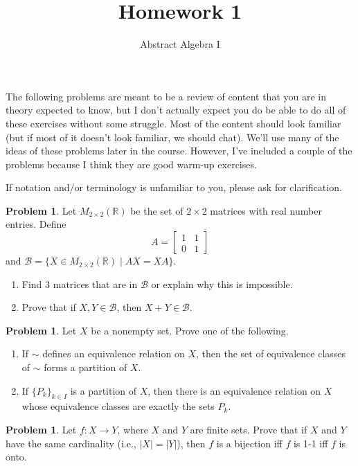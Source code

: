 \documentclass[11pt]{scrartcl}
\theoremstyle{definition}
\newtheorem{problem}[theorem]{Problem}
\begin{document}
\title{Homework 1}
\subtitle{Abstract Algebra I}
\date{}

\maketitle
\thispagestyle{fancy}

The following problems are meant to be a review of content that you are in theory expected to know, but I don't actually expect you do be able to do all of these exercises without some struggle.  Most of the content should look familiar (but if most of it doesn't look familiar, we should chat).  We'll use many of the ideas of these problems later in the course.  However, I've included a couple of the problems because I think they are good warm-up exercises.

If notation and/or terminology is unfamiliar to you, please ask for clarification.

\begin{problem}
Let $M_{2\times 2}(\mathbb{R})$ be the set of $2\times 2$ matrices with real number entries.  Define
\[
A=\begin{bmatrix}
1 & 1\\
0 & 1
\end{bmatrix}
\]
and $\mathcal{B}=\{X\in M_{2\times 2}(\mathbb{R})\mid AX=XA\}$.
\begin{enumerate}[label=\rm{(\alph*)}]
\item Find 3 matrices that are in $\mathcal{B}$ or explain why this is impossible.
\item Prove that if $X,Y\in\mathcal{B}$, then $X+Y\in\mathcal{B}$.
\end{enumerate}
\end{problem}

\begin{problem}
Let $X$ be a nonempty set.  Prove one of the following.
\begin{enumerate}[label=\rm{(\alph*)}]
\item If $\sim$ defines an equivalence relation on $X$, then the set of equivalence classes of $\sim$ forms a partition of $X$.
\item If $\{P_k\}_{k\in I}$ is a partition of $X$, then there is an equivalence relation on $X$ whose equivalence classes are exactly the sets $P_k$.
\end{enumerate}
\end{problem}

\begin{problem}
Let $f:X\to Y$, where $X$ and $Y$ are finite sets. Prove that if $X$ and $Y$ have the same cardinality (i.e., $|X|=|Y|$), then $f$ is a bijection iff $f$ is 1-1 iff $f$ is onto.
\end{problem}
\end{document}
